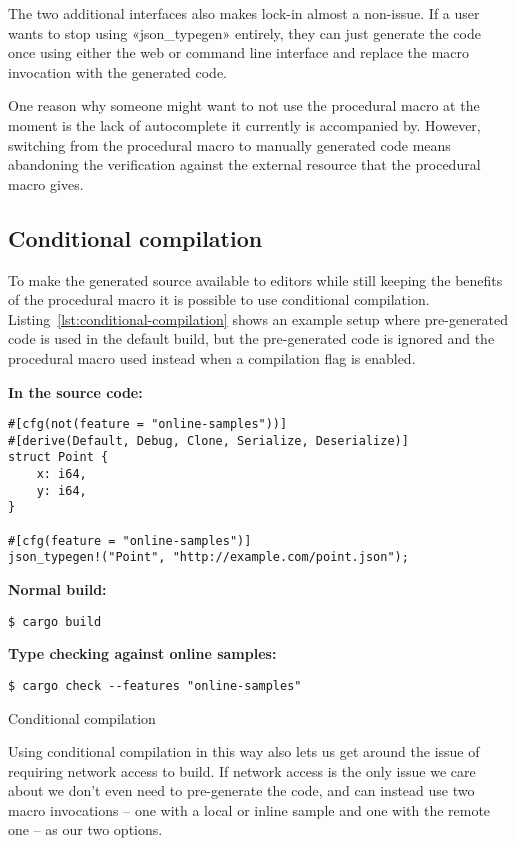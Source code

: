 The two additional interfaces also makes lock-in almost a non-issue. If a user wants to stop using «json_typegen» entirely, they can just generate the code once using either the web or command line interface and replace the macro invocation with the generated code.

One reason why someone might want to not use the procedural macro at the moment is the lack of autocomplete it currently is accompanied by. However, switching from the procedural macro to manually generated code means abandoning the verification against the external resource that the procedural macro gives.

\subsection{Conditional compilation}

To make the generated source available to editors while still keeping the benefits of the procedural macro it is possible to use conditional compilation. Listing~\ref{lst:conditional-compilation} shows an example setup where pre-generated code is used in the default build, but the pre-generated code is ignored and the procedural macro used instead when a compilation flag is enabled.

\begin{listing}[ht!]
\textbf{In the source code:}
\begin{verbatim}
#[cfg(not(feature = "online-samples"))]
#[derive(Default, Debug, Clone, Serialize, Deserialize)]
struct Point {
    x: i64,
    y: i64,
}

#[cfg(feature = "online-samples")]
json_typegen!("Point", "http://example.com/point.json");
\end{verbatim}
\vspace{5mm}

\textbf{Normal build:}
\begin{verbatim}
$ cargo build
\end{verbatim}
\vspace{5mm}

\textbf{Type checking against online samples:}
\begin{verbatim}
$ cargo check --features "online-samples"
\end{verbatim}
\caption{Conditional compilation}
\label{lst:conditional-compilation}
\end{listing}

Using conditional compilation in this way also lets us get around the issue of requiring network access to build. If network access is the only issue we care about we don't even need to pre-generate the code, and can instead use two macro invocations -- one with a local or inline sample and one with the remote one -- as our two options.

